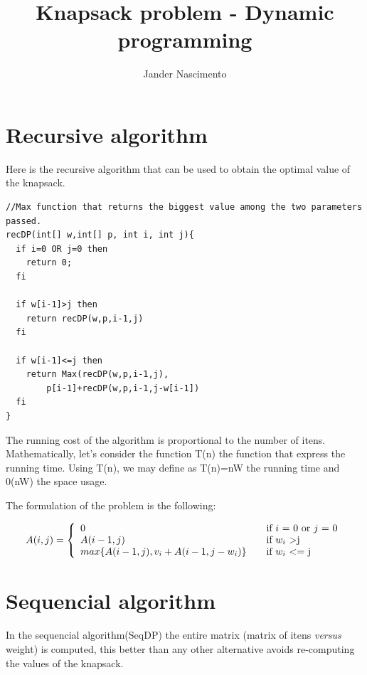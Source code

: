 \documentclass{article}
\begin{document}
\title{Knapsack problem - Dynamic programming}

\author{Jander Nascimento}

\maketitle

\tableofcontents

\section{Recursive algorithm}

Here is the recursive algorithm\cite{algojava} that can be used to obtain the optimal value of the knapsack.

\begin{lstlisting}
//Max function that returns the biggest value among the two parameters passed.
recDP(int[] w,int[] p, int i, int j){
  if i=0 OR j=0 then 
    return 0;
  fi

  if w[i-1]>j then
    return recDP(w,p,i-1,j)
  fi

  if w[i-1]<=j then
    return Max(recDP(w,p,i-1,j),
 		p[i-1]+recDP(w,p,i-1,j-w[i-1])
  fi
}
\end{lstlisting}

The running cost of the algorithm is proportional to the number of itens. Mathematically, let's consider
the function T(n) the function that express the running time. Using T(n), we may define as 
T(n)=nW the running time and 0(nW) the space usage.

The formulation of the problem is the following:

\[
  A(i,j) = \left\{ 
  \begin{array}{l l}
    0 & \quad \textnormal{if $i$ = 0 or $j$ = 0}\\
    A(i-1,j) & \quad \textnormal{if $w_i$ \textgreater j}\\
    max\{A(i-1,j),v_i+A(i-1,j-w_i)\} & \quad \textnormal{if $w_i$ \textless= j}\\
  \end{array} \right.
\]

\section{Sequencial algorithm}          

In the sequencial algorithm(SeqDP) the entire matrix (matrix of itens \textit{versus} weight) is computed, this 
better than any other alternative avoids re-computing the values of the knapsack.
\end{document}
